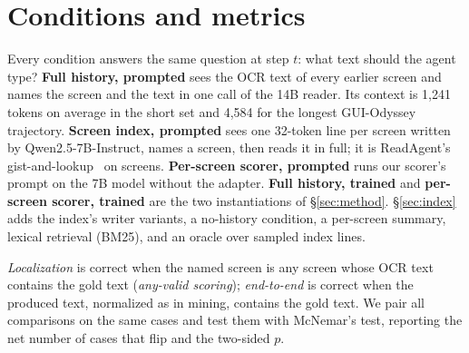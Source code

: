 \section{Conditions and metrics}
Every condition answers the same question at step $t$: what text should the agent type? \textbf{Full history, prompted} sees the OCR text of every earlier screen and names the screen and the text in one call of the 14B reader. Its context is 1,241 tokens on average in the short set and 4,584 for the longest GUI-Odyssey trajectory. \textbf{Screen index, prompted} sees one 32-token line per screen written by Qwen2.5-7B-Instruct, names a screen, then reads it in full; it is ReadAgent's gist-and-lookup~\citep{readagent} on screens. \textbf{Per-screen scorer, prompted} runs our scorer's prompt on the 7B model without the adapter. \textbf{Full history, trained} and \textbf{per-screen scorer, trained} are the two instantiations of \S\ref{sec:method}. \S\ref{sec:index} adds the index's writer variants, a no-history condition, a per-screen summary, lexical retrieval (BM25), and an oracle over sampled index lines.

\emph{Localization} is correct when the named screen is any screen whose OCR text contains the gold text (\emph{any-valid scoring}); \emph{end-to-end} is correct when the produced text, normalized as in mining, contains the gold text. We pair all comparisons on the same cases and test them with McNemar's test, reporting the net number of cases that flip and the two-sided $p$.
